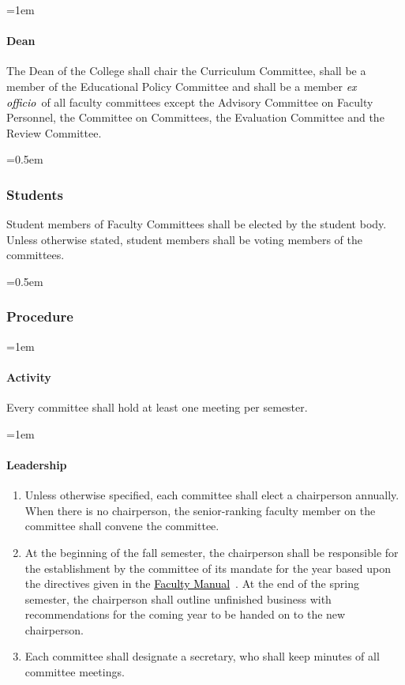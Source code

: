 \documentclass{manual}
\newcommand{\keyword}[1]{\textcolor{black}{#1}}
\newcommand{\facman}{\keyword{\underline{Faculty Manual}}~}
\newcommand{\exoff}{\keyword{\textit{ex officio}}~}
\let\oldsubsubsection\subsubsection
\renewcommand\subsubsection{\leftskip=0.5em\oldsubsubsection}
\let\oldparagraph\paragraph
\renewcommand\paragraph{\leftskip=1em\oldparagraph}
\newcommand{\editRemove}[1]{}
\newcommand{\itemLevelA}{\alph*.}
\newcommand{\itemRefA}{\alph*}
\begin{document}
\paragraph{Dean}
The Dean of the College shall chair the Curriculum Committee, shall be a member of the Educational Policy Committee and shall be a member \exoff of all faculty committees except the Advisory Committee on Faculty Personnel, the Committee on Committees, the Evaluation Committee and the Review Committee.

\subsubsection{Students}
Student members of Faculty Committees shall be elected by the student body. Unless otherwise stated, student members shall be voting members of the committees.

\subsubsection{Procedure}
\paragraph{Activity}
Every committee shall hold at least one meeting per semester.

\paragraph{Leadership}

\begin{enumerate}[label=\itemLevelA,ref=\itemRefA]
\item Unless otherwise specified, each committee shall elect a chairperson annually. When there is no chairperson, the senior-ranking faculty member on the committee shall convene the committee.

\item At the beginning of the fall semester, the chairperson shall be responsible for the establishment by the committee of its mandate for the year based upon the directives given in the \facman. At the end of the spring semester, the chairperson shall outline unfinished business with recommendations for the coming year\editRemove{,} to be handed on to the new chairperson.

\item Each committee shall designate a secretary, who shall keep minutes of all committee meetings.
\end{enumerate}
\end{document}

